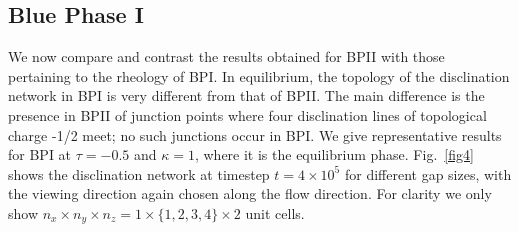 \documentclass[12pt,twoside]{iopart}
\newcommand{\ex}[1]{\times10^{#1}}
\begin{document}
\subsection{Blue Phase I}\label{sec_bpi}

We now compare and contrast the results obtained for BPII with those
pertaining to the rheology of BPI. In equilibrium, the topology
of the disclination network in BPI is very different from that of BPII.
The main difference is the presence in BPII of junction points where four
disclination lines of topological charge -1/2 meet; no such junctions
occur in BPI. We give representative results for BPI at $\tau=-0.5$
and $\kappa=1$, where it is the equilibrium phase.
Fig.~\ref{fig4} shows the disclination network at timestep $t=4\ex{5}$
for different gap sizes, with the viewing direction again chosen along
the flow direction.
For clarity we only show $n_x \times n_y \times n_z= 1 \times \{1,2,3,4\} \times 2$
unit cells.
\end{document}
